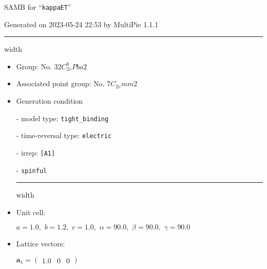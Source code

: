 \documentclass[fleqn,10pt,landscape]{article}
\begin{document}
\setcounter{MaxMatrixCols}{16}

\setlength{\baselineskip}{16pt}
\footnotesize
\begin{center}
\LARGE
SAMB for ``\texttt{kappaET}''
\end{center}
\begin{flushright}
Generated on 2023-05-24 22:53 by MultiPie 1.1.1
\end{flushright}
\vspace{1cm}


 \hfil \hrule height 1mm width \textwidth \hfil

\begin{itemize}
\item Group: No. 32\quad$C_{2v}^{8}$\quad$Pba2$\quad[ orthorhombic ]

\item Associated point group: No. 7\quad$C_{2v}$\quad$mm2$\quad[ orthorhombic ]

\vspace{5mm}

\item Generation condition

\quad - model type: \texttt{tight_binding}

\quad - time-reversal type: \texttt{electric}

\quad - irrep: \texttt{[A1]}

\quad - \texttt{spinful}


 \hfil \hrule height 1mm width \textwidth \hfil

\item Unit cell:

\quad $a=1.0,\,\, b=1.2,\,\, c=1.0,\,\, \alpha=90.0,\,\, \beta=90.0,\,\, \gamma=90.0$

\item Lattice vectors:

\quad $\bm{a}_1=\begin{pmatrix} 1.0 & 0 & 0 \end{pmatrix}$


\end{itemize}
\end{document}
